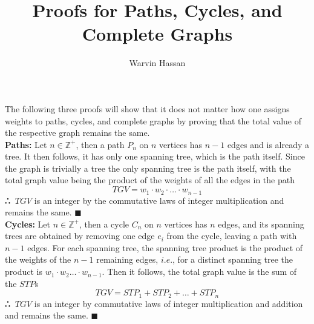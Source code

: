 \documentclass{article}
\title{Proofs for Paths, Cycles, and Complete Graphs}
\author{Warvin Hassan}
\def\therefore{\boldsymbol{\text{ }
\leavevmode
\lower0.4ex\hbox{$\cdot$}
\kern-.5em\raise0.7ex\hbox{$\cdot$}
\kern-0.55em\lower0.4ex\hbox{$\cdot$}
\thinspace\text{ }}}
\begin{document}
\maketitle
The following three proofs will show that it does not matter how one assigns weights to paths, cycles, and complete graphs by proving that the total value of the respective graph remains the same.\\

\textbf{Paths:}
Let $n\in\mathbb{Z}^{+}$, then a path $P_{n}$ on $n$ vertices has $n-1$ edges and is already a tree. It then follows, it has only one spanning tree, which is the path itself. Since the graph is trivially a tree the only spanning tree is the path itself, with the total graph value being the product of the weights of all the edges in the path $$TGV=w_{1}\cdot w_{2}\cdot\ldots\cdot w_{n-1}$$
$\therefore$ $TGV$ is an integer by the commutative laws of integer multiplication and remains the same. $\blacksquare$\\

\textbf{Cycles:}
Let $n\in\mathbb{Z}^{+}$, then a cycle $C_{n}$ on $n$ vertices has $n$ edges, and its spanning trees are obtained by removing one edge $e_{i}$ from the cycle, leaving a path with $n-1$ edges. For each spanning tree, the spanning tree product is the product of the weights of the $n-1$ remaining edges, $i.e.$, for a distinct spanning tree the product is $w_{1}\cdot w_{2}\ldots \cdot w_{n-1}$. Then it follows, the total graph value is the sum of the $STP$s $$TGV=STP_{1}+STP_{2}+\ldots+STP_{n}$$
$\therefore$ $TGV$ is an integer by commutative laws of integer multiplication and addition and remains the same. $\blacksquare$\\
\end{document}
